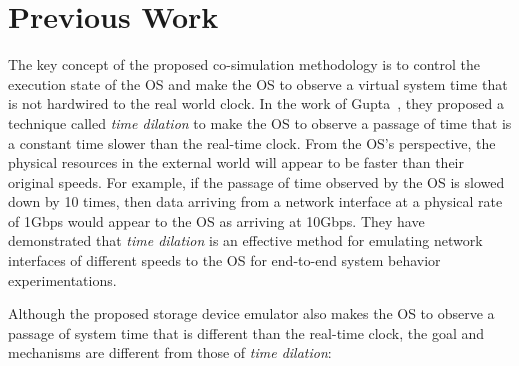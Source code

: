 \chapter{Previous Work}
\label{ch:4}

The key concept of the proposed co-simulation methodology is to control the execution state of the OS and make the OS to observe a virtual system time that is not hardwired to the real world clock. In the work of Gupta~\cite{Gupta:2006}, they proposed a technique called \textit{time dilation} to make the OS to observe a passage of time that is a constant time slower than the real-time clock. From the OS’s perspective, the physical resources in the external world will appear to be faster than their original speeds. For example, if the passage of time observed by the OS is slowed down by 10 times, then data arriving from a network interface at a physical rate of 1Gbps would appear to the OS as arriving at 10Gbps. They have demonstrated that \textit{time dilation} is an effective method for emulating network interfaces of different speeds to the OS for end-to-end system behavior experimentations. 

Although the proposed storage device emulator also makes the OS to observe a passage of system time that is different than the real-time clock, the goal and mechanisms are different from those of \textit{time dilation}:

